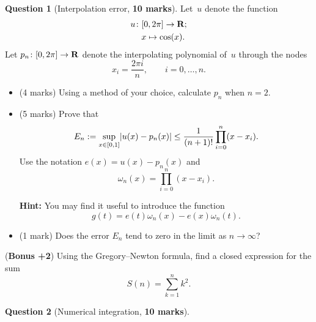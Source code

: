 \documentclass[11pt]{article}
\theoremstyle{definition}
\newtheorem{question}{Question}
\begin{document}
\newpage
\begin{question}
    [Interpolation error, \textbf{10 marks}]
    Let~$u$ denote the function
    \begin{align*}
        u\colon
        &[0, 2\pi] \to \mathbf R; \\
        &x \mapsto \cos(x).
    \end{align*}
    Let $p_n \colon [0, 2 \pi] \to \mathbf R$ denote the interpolating polynomial of~$u$ through the nodes
    \[
        x_i = \frac{2 \pi i}{n}, \qquad i = 0, \dotsc, n.
    \]
    \begin{itemize}
        \item
            (4 marks)
            Using a method of your choice,
            calculate $p_n$ when $n = 2$.

        \item
            (5 marks)
            Prove that
            \[
                E_n := \sup_{x \in [0, 1]} \lvert u(x) - p_n(x)\rvert
                \leq \frac{1}{(n+1)!} \prod_{i=0}^{n} (x - x_i).
            \]
            Use the notation $e(x) = u(x) - p_n(x)$ and
            \[
                \omega_n(x) = \prod_{i=0}^{n} (x - x_i).
            \]
            
            \textbf{Hint:} You may find it useful to introduce the function
            \[
                g(t) = e(t) \omega_n(x) - e(x) \omega_n(t).
            \]
        \item (1 mark) Does the error $E_n$ tend to zero in the limit as $n \to \infty$?
    \end{itemize}

    \noindent (\textbf{Bonus +2}) Using the Gregory--Newton formula,
    find a closed expression for the sum
    \[
        S(n) = \sum_{k=1}^{n} k^2.
    \]
\end{question}

\newpage
\begin{question}
    [Numerical integration, \textbf{10 marks}]
\end{question}
\end{document}
